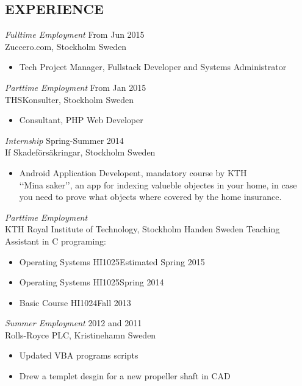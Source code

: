 \documentclass[margin]{res}
\begin{document}
\begin{resume}
 
\section{EXPERIENCE}
{\sl Fulltime Employment } \hfill  From Jun 2015 \\
                Zuccero.com, Stockholm Sweden
                 \begin{itemize}  \itemsep -2pt %
                 \item  Tech Projcet Manager, Fullstack Developer and Systems Administrator\hfill 
                \end{itemize}
{\sl Parttime Employment } \hfill  From Jan 2015 \\
                THSKonsulter, Stockholm Sweden
                 \begin{itemize}  \itemsep -2pt %
                 \item  Consultant, PHP Web Developer\hfill 
                \end{itemize}
    {\sl Internship } \hfill Spring-Summer 2014 \\
                If Skadeförsäkringar, Stockholm Sweden
                 \begin{itemize}  \itemsep -2pt %
                 \item Android Application Developent, mandatory course by KTH \\ ‘‘Mina saker’’, an app for indexing valueble objectes in your home, in case you need to prove what objects where covered by the home insurance.
                \end{itemize}

   {\sl Parttime Employment }  \\
               KTH Royal Institute of Technology, Stockholm Handen Sweden
               Teaching Assistant in C programing:
                 \begin{itemize}  \itemsep -2pt %
                 \item   Operating Systems HI1025\hfill Estimated Spring 2015
                 \item  Operating Systems HI1025\hfill Spring 2014
                 \item  Basic Course HI1024\hfill Fall 2013
                \end{itemize}

                
     {\sl Summer Employment } \hfill 2012 and 2011 \\
                 Rolls-Royce PLC, Kristinehamn Sweden
                 \begin{itemize}  \itemsep -2pt %
                 \item Updated VBA programs scripts
                \item  Drew a templet desgin for a new propeller shaft in CAD
               


\end{itemize}
\end{resume}
\end{document}
